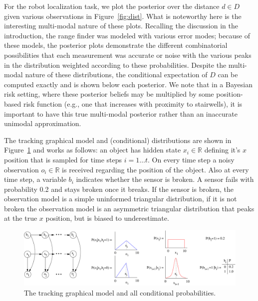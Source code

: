\documentclass[letterpaper]{article}
\newcommand{\R}{\mathbb{R}}
\begin{document}
{For the {robot localization} task, we plot the posterior over
the distance $d \in D$ given various observations in Figure~\ref{fig:dist}.
What is noteworthy here is the interesting multi-modal
nature of these plots. Recalling the discussion in the introduction,
the range finder was modeled with various error modes; because of these
models, the posterior plots demonstrate the different combinatorial
possibilities that each measurement was accurate or noise with the various
peaks in the distribution weighted according to these probabilities.
Despite the multi-modal nature of these distributions, the conditional 
expectation of $D$ can be computed exactly and is shown below each posterior.
We note that in a Bayesian risk setting, where these posterior beliefs
may be multiplied by some position-based risk function (e.g., one
that increases with proximity to stairwells),
it is important to have this true multi-modal posterior rather than an 
inaccurate unimodal approximation.

The {tracking} graphical model and (conditional) distributions
are shown in Figure~\ref{fig:gm3}
and works as follows: an object has hidden state $x_i \in \R$ defining
it's $x$ position that is sampled for time steps $i = 1 \ldots t$.  On
every time step a noisy observation $o_i \in \R$ is received regarding
the position of the object.  Also at every time step, a variable $b_i$
indicates whether the sensor is broken.  A sensor fails with probability
0.2 and stays broken once it breaks.  If the sensor is broken, the
observation model is a simple uninformed triangular distribution, if
it is not broken the observation model is an asymmetric triangular %
distribution that peaks at the true $x$ position, but is biased
to underestimate.

\begin{figure}[t!]
\begin{center}
\vspace{-1mm}
\includegraphics[width=.7\textwidth]{gm3.pdf}
\end{center}
\vspace{-6mm}
\caption{\footnotesize The {tracking} graphical model and all conditional probabilities.} \label{fig:gm3}
\end{figure}

}
\end{document}
